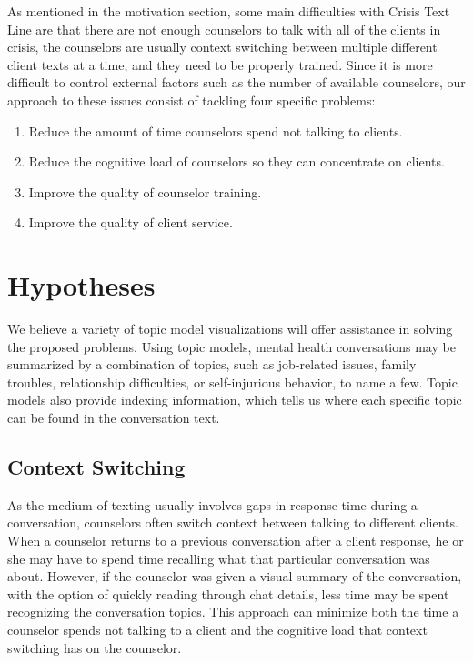 As mentioned in the motivation section, some main difficulties with Crisis Text Line
are that there are not enough counselors to talk with all of the clients in crisis, the
counselors are usually context switching between multiple different client texts at a
time, and they need to be properly trained. Since it is more difficult to control external
factors such as the number of available counselors, our approach to these issues
consist of tackling four specific problems:
\begin{enumerate}
  \item Reduce the amount of time counselors spend not talking to clients.
  \item Reduce the cognitive load of counselors so they can concentrate on clients.
  \item Improve the quality of counselor training.
  \item Improve the quality of client service.
\end{enumerate}

\section{Hypotheses}

We believe a variety of topic model visualizations will offer assistance in solving the
proposed problems. Using topic models, mental health conversations may be
summarized by a combination of topics, such as job-related issues, family troubles,
relationship difficulties, or self-injurious behavior, to name a few. Topic models also
provide indexing information, which tells us where each specific topic can be found
in the conversation text.

\subsection{Context Switching}

As the medium of texting usually involves gaps in response time during a
conversation, counselors often switch context between talking to different clients.
When a counselor returns to a previous conversation after a client response,
he or she may have to spend time recalling what that particular conversation was
about. However, if the counselor was given a visual summary of the conversation,
with the option of quickly reading through chat details, less time may be spent
recognizing the conversation topics. This approach can minimize both the time
a counselor spends not talking to a client and the cognitive load that context
switching has on the counselor.

